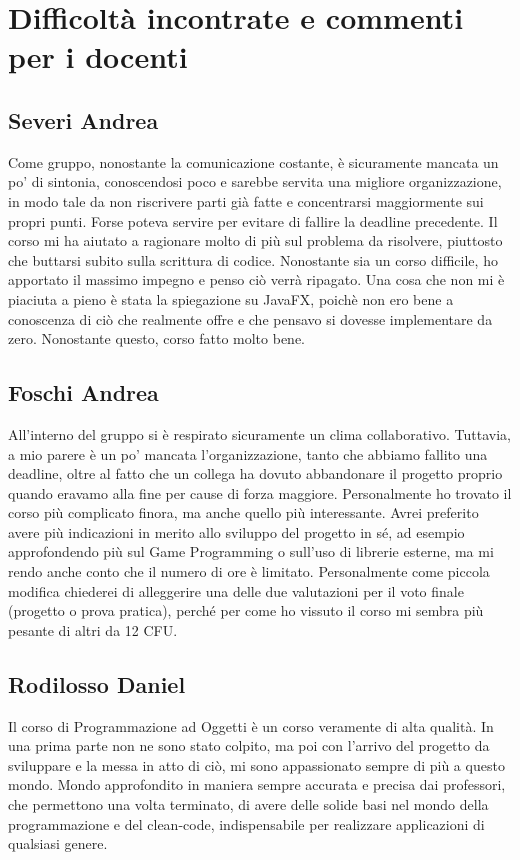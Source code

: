 \documentclass[a4paper,12pt]{report}
\begin{document}
\section{Difficoltà incontrate e commenti per i docenti}
\subsection{Severi Andrea}
Come gruppo, nonostante la comunicazione costante, è sicuramente mancata un po' di sintonia, conoscendosi poco e sarebbe servita una migliore organizzazione, in modo tale da non riscrivere parti già fatte e concentrarsi maggiormente sui propri punti. Forse poteva servire per evitare di fallire la deadline precedente. 
Il corso mi ha aiutato a ragionare molto di più sul problema da risolvere, piuttosto che buttarsi subito sulla scrittura di codice. Nonostante sia un corso difficile, ho apportato il massimo impegno e penso ciò verrà ripagato.
Una cosa che non mi è piaciuta a pieno è stata la spiegazione su JavaFX, poichè non ero bene a conoscenza di ciò che realmente offre e che pensavo si dovesse implementare da zero. Nonostante questo, corso fatto molto bene.

\subsection{Foschi Andrea}
All’interno del gruppo si è respirato sicuramente un clima collaborativo. Tuttavia, a mio parere è un po’ mancata l’organizzazione, tanto che abbiamo fallito una deadline, oltre al fatto che un collega ha dovuto abbandonare il progetto proprio quando eravamo alla fine per cause di forza maggiore. Personalmente ho trovato il corso più complicato finora, ma anche quello più interessante. Avrei preferito avere più indicazioni in merito allo sviluppo del progetto in sé, ad esempio approfondendo più sul Game Programming o sull’uso di librerie esterne, ma mi rendo anche conto che il numero di ore è limitato. Personalmente come piccola modifica chiederei di alleggerire una delle due valutazioni per il voto finale (progetto o prova pratica), perché per come ho vissuto il corso mi sembra più pesante di altri da 12 CFU.
            
\subsection{Rodilosso Daniel}
Il corso di Programmazione ad Oggetti è un corso veramente di alta qualità.
In una prima parte non ne sono stato colpito, ma poi con l’arrivo del progetto da sviluppare e la messa in atto di ciò, mi sono appassionato sempre di più a questo mondo.
Mondo approfondito in maniera sempre accurata e precisa dai professori, che permettono una volta terminato, di avere delle solide basi nel mondo della programmazione e del clean-code, indispensabile per realizzare applicazioni di qualsiasi genere.
\end{document}
